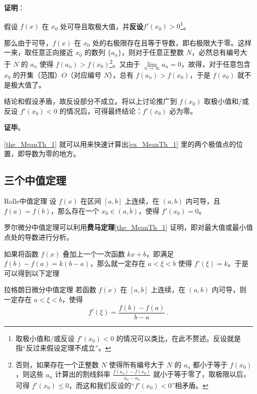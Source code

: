 \textbf{证明}：

假设 $f(x)$ 在 $x_0$ 处可导且取极大值，并\textbf{反设}$f'(x_0)>0$\footnote{取极小值和/或反设 $f'(x_0)<0$ 的情况可以类比，在此不赘述。反设就是指“反过来假设定理不成立”。}。

那么由于可导，$f(x)$ 在 $x_0$ 处的右极限存在且等于导数，即右极限大于零。这样一来，取任意正向接近 $x_0$ 的数列 $\{a_n\}$，则对于任意正整数 $N$，必然总有编号大于 $N$ 的 $a_n$ 使得 $f(a_n)>f(x_0)$\footnote{否则，如果存在一个正整数 $N$ 使得所有编号大于 $N$ 的 $a_n$ 都小于等于 $f(x_0)$，则这些 $a_n$ 计算出的割线斜率 $\frac{f(a_n)-f(x_0)}{a_n-x_0}$ 就小于等于零了，取极限以后，可得 $f'(x_0)\leq 0$，而这和我们反设的“$f'(x_0)<0$”相矛盾。}。又由于 $\lim\limits_{n\to\infty}a_n=0$，故得，对于任意包含 $x_0$ 的开集（范围）$O$（对应编号 $N$），总有 $f(a_n)>f(x_0)$，于是 $f(x_0)$ 就不是极大值了。

结论和假设矛盾，故反设部分不成立。将以上讨论推广到 $f(x_0)$ 取极小值和/或反设 $f'(x_0)<0$ 的情况后，可得最终结论：$f'(x_0)$ 必为零。

\textbf{证毕}。

\autoref{the_MeanTh_1} 就可以用来快速计算出\autoref{ex_MeanTh_1} 里的两个极值点的位置，即导数为零的地方。


\subsection{三个中值定理}


\begin{definition}{Rolle中值定理}
设 $f(x)$ 在区间 $[a, b]$ 上连续，在 $(a, b)$ 内可导，且 $f(a)=f(b)$，那么存在一个 $x_0\in(a, b)$，使得 $f'(x_0)=0$。
\end{definition}

罗尔微分中值定理可以利用\textbf{费马定理}\autoref{the_MeanTh_1} 证明，即对最大值或最小值点处的导数进行分析。

如果将函数 $f(x)$ 叠加上一个一次函数 $kx+b$，即满足 $f(b)-f(a)=k(b-a)$，那么就一定存在 $a< \xi <b$ 使得 $f'(\xi)=k$。于是可以得到以下定理

\begin{theorem}{拉格朗日微分中值定理}\label{the_MeanTh_2}
若函数 $f(x)$ 在 $[a,b]$ 上连续，在 $(a,b)$ 内可导，则一定存在 $a< \xi <b$，使得
\begin{equation}\label{eq_MeanTh_2}
f'(\xi)=\frac{f(b)-f(a)}{b-a}~.
\end{equation}
\end{theorem}

